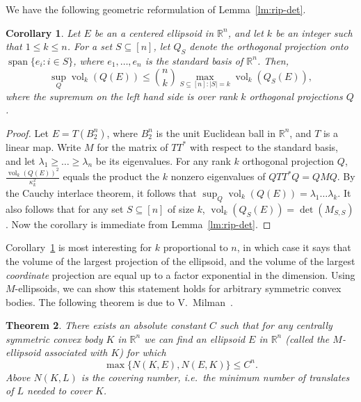 \documentclass{article}
\newtheorem{theorem}{Theorem}
\newtheorem{corollary}[theorem]{Corollary}
\newcommand{\R}{{\mathbb{R}}}
\DeclareMathOperator{\vol}{vol}
\DeclareMathOperator{\lspan}{span}
\begin{document}
We have the following geometric reformulation of
Lemma~\ref{lm:rip-det}.

\begin{corollary}\label{cor:ellipsoids}
  Let $E$ be an a centered ellipsoid in $\R^n$, and let $k$ be an
  integer such that $1 \le k \le n$. For a set $S \subseteq [n]$, let
  $Q_S$ denote the orthogonal projection onto $\lspan\{e_i: i \in
  S\}$, where $e_1, \ldots, e_n$ is the standard basis of
  $\R^n$. Then,
  \[
  \sup_Q \vol_k(Q(E)) \le
  {n \choose k}
  \max_{S \subseteq [n]: |S| = k}\vol_k(Q_S(E)),
  \]
  where the supremum on the left hand side is over rank $k$ orthogonal
  projections $Q$.
\end{corollary}
\begin{proof}
  Let $E = T(B_2^n)$, where $B_2^n$ is the unit Euclidean ball in
  $\R^n$, and $T$ is a linear map. Write $M$ for the matrix of $TT^*$
  with respect to the standard basis, and let $\lambda_1 \ge \ldots
  \ge \lambda_n$ be its eigenvalues. For any rank $k$ orthogonal
  projection $Q$, $\frac{\vol_k(Q(E))^2}{\kappa_k^2}$ equals the product
  the $k$ nonzero eigenvalues of $QTT^*Q = QMQ$. By the Cauchy interlace
  theorem, it follows that $\sup_Q \vol_k(Q(E)) = \lambda_1 \ldots
  \lambda_k$. It also follows that for any set $S \subseteq [n]$ of
  size $k$, $\vol_k(Q_S(E)) = \det(M_{S,S})$. Now the corollary
  is immediate from Lemma~\ref{lm:rip-det}. 
\end{proof}

Corollary~\ref{cor:ellipsoids} is most interesting for $k$
proportional to $n$, in which case it says that the volume of the
largest projection of the ellipsoid, and the volume of the largest
\emph{coordinate} projection are equal up to a factor exponential in
the dimension. Using $M$-ellipsoids, we can show this statement holds
for arbitrary symmetric convex bodies. The following theorem is due to
V.~Milman~\cite{Milman86-reverseBM}.

\begin{theorem}\label{thm:M-ellips}
  There exists an absolute constant $C$ such that for any centrally
  symmetric convex body $K$ in $\R^n$ we can find an ellipsoid $E$ in
  $\R^n$ (called the $M$-ellipsoid associated with $K$) for which
  \[
  \max\{N(K, E), N(E, K)\} \le C^n. 
  \]
  Above $N(K, L)$ is the covering number, i.e.~the minimum number of
  translates of $L$ needed to cover $K$.
\end{theorem}
\end{document}
